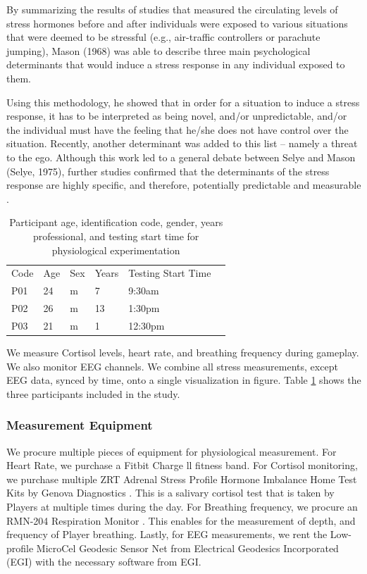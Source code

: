 \documentclass[10pt, titlepage, twocolumn]{article}
\newcommand{\ii}{\indent\indent}
\begin{document}
By summarizing the results of studies that measured the circulating levels of stress hormones before and after individuals were exposed to various situations that were deemed to be stressful (e.g., air-traffic controllers or parachute jumping), Mason (1968) was able to describe three main psychological determinants that would induce a stress response in any individual exposed to them. 

Using this methodology, he showed that in order for a situation to induce a stress response, it has to be interpreted as being novel, and/or unpredictable, and/or the individual must have the feeling that he/she does not have control over the situation. Recently, another determinant was added to this list -- namely a threat to the ego. Although this work led to a general debate between Selye and Mason (Selye, 1975), further studies confirmed that the determinants of the stress response are highly specific, and therefore, potentially predictable and measurable \cite{stress}.

\begin{table}[]
\centering
\caption{Participant age, identification code, gender, years professional, and testing start time for physiological experimentation}
\label{parttable}
\begin{tabular}{llllll}
Code 	& 	Age 	& 	Sex 	& 	Years 	& 	Testing Start Time	 	&  \\
P01  	& 	24  		& 	m   		& 	7     	&    9:30am     				&  \\
P02  	& 	26  		& 	m   		& 	13     	&    1:30pm               		&  \\
P03  	& 	21  		& 	m   		& 	1     	&    12:30pm  	 	            & 
\end{tabular}
\end{table}

We measure Cortisol levels, heart rate, and breathing frequency during gameplay. We also monitor EEG channels. We combine all stress measurements, except EEG data, synced by time, onto a single visualization in figure. Table \ref{parttable} shows the three participants included in the study.

\subsubsection{Measurement Equipment}
\ii
We procure multiple pieces of equipment for physiological measurement. For Heart Rate, we purchase a Fitbit Charge ll fitness band. For Cortisol monitoring, we purchase multiple ZRT Adrenal Stress Profile Hormone Imbalance Home Test Kits by Genova Diagnostics \cite{cortprof}. This is a salivary cortisol test that is taken by Players at multiple times during the day. For Breathing frequency, we procure an RMN-204 Respiration Monitor \cite{breath}. This enables for the measurement of depth, and frequency of Player breathing. Lastly, for EEG measurements, we rent the Low-profile MicroCel Geodesic Sensor Net from Electrical Geodesics Incorporated (EGI) \cite{egi} with the necessary software from EGI.
\end{document}
